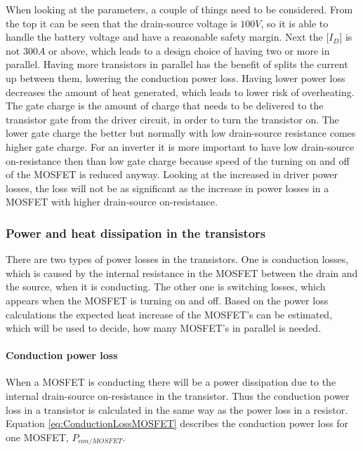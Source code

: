 When looking at the parameters, a couple of things need to be considered. From the top it can be seen that the drain-source voltage is $100 V$, so it is able to handle the battery voltage and have a reasonable safety margin. 
Next the [$I_D$] is not $300 A$ or above, which leads to a design choice of having two or more in parallel. Having more transistors in parallel has the benefit of splits the current up between them, lowering the conduction power loss. 
Having lower power loss decreases the amount of heat generated, which leads to lower risk of overheating. 
The gate charge is the amount of charge that needs to be delivered to the transistor gate from the driver circuit, in order to turn the transistor on. 
The lower gate charge the better but normally with low drain-source resistance comes higher gate charge.
For an inverter it is more important to have low drain-source on-resistance then than low gate charge because speed of the turning on and off of the MOSFET is reduced anyway. Looking at the increased in driver power losses, the loss will not be as significant as the increase in power losses in a MOSFET with higher drain-source on-resistance.\\ 


\subsubsection{Power and heat dissipation in the transistors}
There are two types of power losses in the transistors. One is conduction losses, which is caused by the internal resistance in the MOSFET between the drain and the source, when it is conducting. The other one is switching losses, which appears when the MOSFET is turning on and off. Based on the power loss calculations the expected heat increase of the MOSFET's can be estimated, which will be used to decide, how many MOSFET's in parallel is needed.

\paragraph{Conduction power loss}
When a MOSFET is conducting there will be a power dissipation due to the internal drain-source on-resistance in the transistor. Thus the conduction power loss in a transistor is calculated in the same way as the power loss in a resistor. Equation \ref{eq:ConductionLossMOSFET} describes the conduction power loss for one MOSFET, $P_{con/MOSFET}$.

